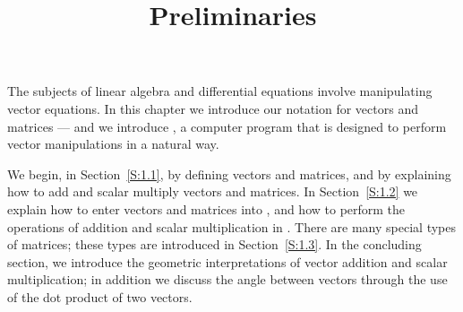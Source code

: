 \documentclass{ximera}
\title{Preliminaries}
\begin{document}
\begin{abstract}
\end{abstract}
\maketitle

The subjects of linear algebra and differential equations involve
manipulating vector equations.  In this chapter we introduce our
notation for vectors and matrices --- and we introduce \Matlabp,
a computer program that is designed to perform vector
manipulations in a natural way.

We begin, in Section~\ref{S:1.1}, by defining vectors and matrices, and
by explaining how to add and scalar multiply vectors and matrices.
In Section~\ref{S:1.2} we explain how to enter vectors and matrices
into \Matlabp, and how to perform the operations of addition and
scalar multiplication in \Matlabp.  There are many special types of matrices;
these types are introduced in Section~\ref{S:1.3}. In the concluding
section, we introduce the geometric interpretations of vector addition
and scalar multiplication; in addition we discuss the angle between
vectors through the use of the dot product of two vectors.
\end{document}
